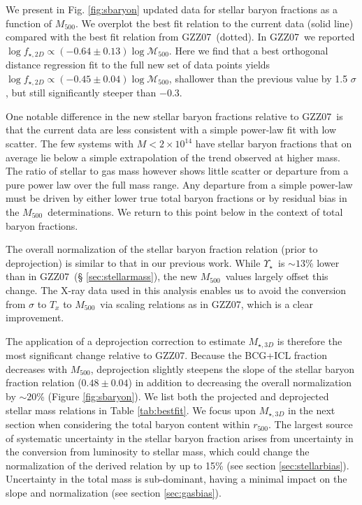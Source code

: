 \documentclass[preprint]{emulateapj}
\newcommand\rfive{$r_{500}$}
\newcommand\ptwo{GZZ07}
\newcommand\mfive{${M}_{500}$}
\newcommand{\mlrat}{$\Upsilon_\star$}
\begin{document}
We present in Fig. \ref{fig:sbaryon} updated data for stellar baryon
fractions as a function of \mfive.  We overplot the best fit relation
to the current data (solid line) compared with the best fit relation
from \ptwo\ (dotted).  In \ptwo\ we reported $\log f_{\star,2D}\propto
(-0.64\pm0.13)\log \mathcal{M}_{500}$. Here we find that a best
orthogonal distance regression fit to the full new set of data points
yields $\log f_{\star,2D}\propto (-0.45\pm0.04)\log
\mathcal{M}_{500}$, shallower than the previous value by 1.5 $\sigma$,
but still significantly steeper than $-0.3$.

One notable difference in the new stellar baryon fractions relative to
\ptwo\ is that the current data are less consistent with a simple
power-law fit with low scatter.  The few systems with
$M<2\times10^{14}$ have stellar baryon fractions that on average lie
below a simple extrapolation of the trend observed at higher mass. The
ratio of stellar to gas mass however shows little scatter or departure
from a pure power law over the full mass range.  Any departure from a
simple power-law must be driven by either lower true total baryon
fractions or by residual bias in the \mfive\ determinations. We return
to this point below in the context of total baryon fractions.



The overall normalization of the stellar baryon fraction relation
(prior to deprojection) is similar to that in our previous work.
While \mlrat\ is $\sim13$\% lower than in \ptwo\ (\S
\ref{sec:stellarmass}), the new \mfive\ values largely offset this
change.  The X-ray data used in this analysis enables us to avoid the
conversion from $\sigma$ to $T_x$ to \mfive\ via scaling relations as
in \ptwo, which is a clear improvement.

The application of a deprojection correction to estimate
$M_{\star,3D}$ is therefore the most significant change relative to
\ptwo. Because the BCG+ICL fraction decreases with \mfive,
deprojection slightly steepens the slope of the stellar baryon
fraction relation ($0.48\pm0.04$) in addition to decreasing the
overall normalization by $\sim20$\% (Figure \ref{fig:sbaryon}). We
list both the projected and deprojected stellar mass relations in
Table \ref{tab:bestfit}. We focus upon $M_{\star,3D}$ in the next
section when considering the total baryon content within \rfive.
The largest source of systematic
uncertainty in the stellar baryon fraction arises from uncertainty in 
the conversion from luminosity to stellar mass, which could change
the normalization of the derived relation by up to 15\% (see section \ref{sec:stellarbias}).
Uncertainty in the total mass is sub-dominant, having a minimal impact on the slope and
normalization (see section \ref{sec:gasbias}).
\end{document}
